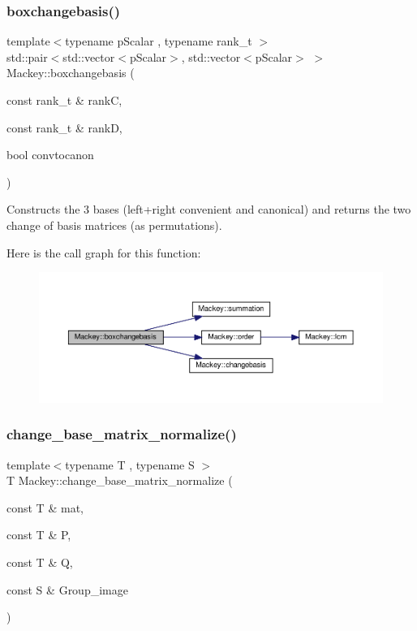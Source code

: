 \subsubsection{\texorpdfstring{boxchangebasis()}{boxchangebasis()}}
{\footnotesize\ttfamily template$<$typename p\+Scalar , typename rank\+\_\+t $>$ \\
std\+::pair$<$std\+::vector$<$p\+Scalar$>$, std\+::vector$<$p\+Scalar$>$ $>$ Mackey\+::boxchangebasis (\begin{DoxyParamCaption}\item[{const rank\+\_\+t \&}]{rankC,  }\item[{const rank\+\_\+t \&}]{rankD,  }\item[{bool}]{convtocanon }\end{DoxyParamCaption})}



Constructs the 3 bases (left+right convenient and canonical) and returns the two change of basis matrices (as permutations). 

Here is the call graph for this function\+:\nopagebreak
\begin{figure}[H]
\begin{center}
\leavevmode
\includegraphics[width=350pt]{namespaceMackey_a232e85ca1fb9017788b33b7f6f2c269b_cgraph}
\end{center}
\end{figure}
\mbox{\label{namespaceMackey_a65dac6a38a02a4efc56d52292ea8cbd8}} 
\subsubsection{\texorpdfstring{change\+\_\+base\+\_\+matrix\+\_\+normalize()}{change\_base\_matrix\_normalize()}}
{\footnotesize\ttfamily template$<$typename T , typename S $>$ \\
T Mackey\+::change\+\_\+base\+\_\+matrix\+\_\+normalize (\begin{DoxyParamCaption}\item[{const T \&}]{mat,  }\item[{const T \&}]{P,  }\item[{const T \&}]{Q,  }\item[{const S \&}]{Group\+\_\+image }\end{DoxyParamCaption})}



